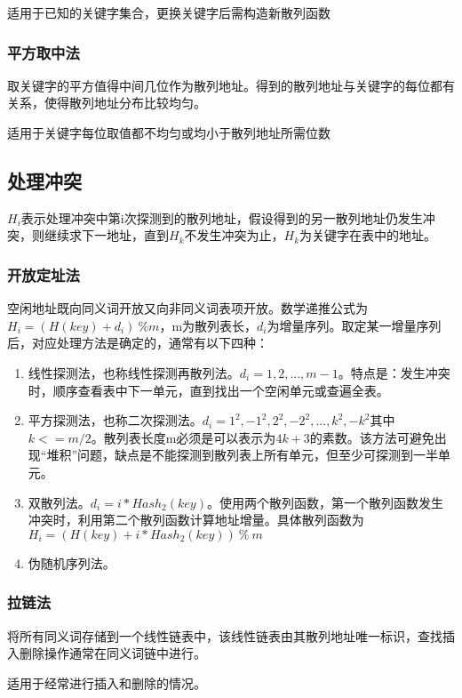 适用于已知的关键字集合，更换关键字后需构造新散列函数


\subsubsection{平方取中法}
取关键字的平方值得中间几位作为散列地址。得到的散列地址与关键字的每位都有关系，使得散列地址分布比较均匀。

适用于关键字每位取值都不均匀或均小于散列地址所需位数


\subsection{处理冲突}
\(H_i\)表示处理冲突中第i次探测到的散列地址，假设得到的另一散列地址仍发生冲突，则继续求下一地址，直到\(H_k\)不发生冲突为止，\(H_k\)为关键字在表中的地址。

\subsubsection{开放定址法}
空闲地址既向同义词开放又向非同义词表项开放。数学递推公式为\(H_i = (H(key) + d_i)\ \% m\)，m为散列表长，\(d_i\)为增量序列。取定某一增量序列后，对应处理方法是确定的，通常有以下四种：
\begin{enumerate}
    \item 线性探测法，也称线性探测再散列法。\(d_i = 1, 2, ..., m - 1\)。特点是：发生冲突时，顺序查看表中下一单元，直到找出一个空闲单元或查遍全表。
    \item 平方探测法，也称二次探测法。\(d_i = 1^2, -1^2, 2^2, -2^2, ..., k^2, -k^2\)其中\(k <= m / 2\)。散列表长度m必须是可以表示为\(4k + 3\)的素数。该方法可避免出现“堆积”问题，缺点是不能探测到散列表上所有单元，但至少可探测到一半单元。
    \item 双散列法。\(d_i = i * Hash_2(key)\)。使用两个散列函数，第一个散列函数发生冲突时，利用第二个散列函数计算地址增量。具体散列函数为\(H_i = (H(key) + i * Hash_2(key))\ \%\ m\)
    \item 伪随机序列法。
\end{enumerate}


\subsubsection{拉链法}
将所有同义词存储到一个线性链表中，该线性链表由其散列地址唯一标识，查找插入删除操作通常在同义词链中进行。

适用于经常进行插入和删除的情况。


